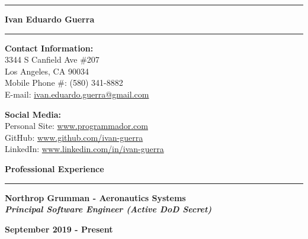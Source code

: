 \documentclass[11pt,letterpaper]{article}
\begin{document}

\hrule
\begin{center}
    \begin{LARGE}
        \textbf{Ivan Eduardo Guerra}
    \end{LARGE}
\end{center}
\hrule

\medskip

\begin{minipage}[t]{0.53\textwidth}
    \begin{flushleft}
        \textbf{Contact Information:}\\
        3344 S Canfield Ave \#207\\
        Los Angeles, CA 90034\\
        Mobile Phone \#: (580) 341-8882\\
        E-mail:
            \href{mailto:ivan.eduardo.guerra@gmail.com}{ivan.eduardo.guerra@gmail.com}
    \end{flushleft}
\end{minipage}
\begin{minipage}[t]{0.44\textwidth}
    \begin{flushright}
        \begin{flushleft}
            \textbf{Social Media:}\\
            Personal Site: \url{www.programmador.com}\\
            GitHub: \url{www.github.com/ivan-guerra}\\
            LinkedIn: \url{www.linkedin.com/in/ivan-guerra}
        \end{flushleft}
    \end{flushright}
\end{minipage}

\medskip

\begin{large}
    \textbf{Professional Experience}
\end{large}

\smallskip \hrule \smallskip

\begin{minipage}[t]{0.53\textwidth}
    \begin{flushleft}
        \textbf{Northrop Grumman - Aeronautics Systems}\\
        \textbf{\textit{Principal Software Engineer (Active DoD Secret)}}\\
    \end{flushleft}
\end{minipage}
\begin{minipage}[t]{0.44\textwidth}
    \begin{flushright}
        \textbf{September 2019 - Present}
    \end{flushright}
\end{minipage}
\end{document}
